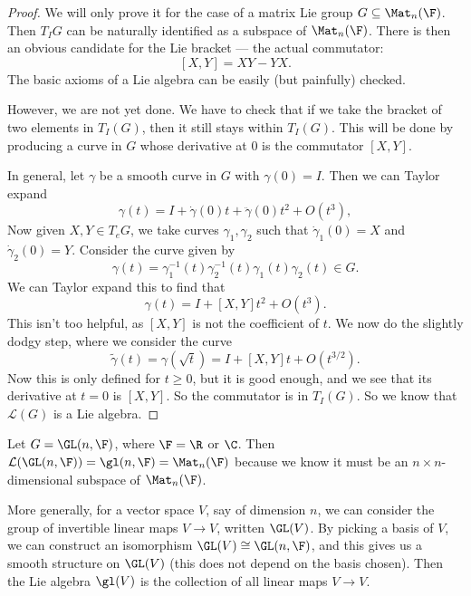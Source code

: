 \documentclass[a4paper]{article}
\begin{document}
\begin{proof}
  We will only prove it for the case of a matrix Lie group $G \subseteq \Mat_n(\F)$. Then $T_I G$ can be naturally identified as a subspace of $\Mat_n(\F)$. There is then an obvious candidate for the Lie bracket --- the actual commutator:
  \[
    [X, Y] = XY - YX.
  \]
  The basic axioms of a Lie algebra can be easily (but painfully) checked.

  However, we are not yet done. We have to check that if we take the bracket of two elements in $T_I(G)$, then it still stays within $T_I(G)$. This will be done by producing a curve in $G$ whose derivative at $0$ is the commutator $[X, Y]$.

  In general, let $\gamma$ be a smooth curve in $G$ with $\gamma(0) = I$. Then we can Taylor expand
  \[
    \gamma(t) = I + \dot{\gamma}(0) t + \ddot{\gamma}(0) t^2 + O(t^3),
  \]
  Now given $X, Y \in T_e G$, we take curves $\gamma_1, \gamma_2$ such that $\dot{\gamma}_1(0) = X$ and $\dot{\gamma}_2(0) = Y$. Consider the curve given by
  \[
    \gamma(t) = \gamma_1^{-1}(t) \gamma_2^{-1}(t) \gamma_1(t)\gamma_2(t) \in G.
  \]
  We can Taylor expand this to find that
  \[
    \gamma(t) = I + [X, Y] t^2 + O(t^3).
  \]
  This isn't too helpful, as $[X, Y]$ is not the coefficient of $t$. We now do the slightly dodgy step, where we consider the curve
  \[
    \tilde{\gamma}(t) = \gamma(\sqrt{t}) = I + [X, Y] t + O(t^{3/2}).
  \]
  Now this is only defined for $t \geq 0$, but it is good enough, and we see that its derivative at $t = 0$ is $[X, Y]$. So the commutator is in $T_I(G)$. So we know that $\mathcal{L}(G)$ is a Lie algebra.
\end{proof}

\begin{eg}
  Let $G = \GL(n, \F)$, where $\F = \R$ or $\C$. Then $\mathcal{L}(\GL(n, \F)) = \gl(n, \F) = \Mat_n(\F)$ because we know it must be an $n \times n$-dimensional subspace of $\Mat_n(\F)$.

  More generally, for a vector space $V$, say of dimension $n$, we can consider the group of invertible linear maps $V \to V$, written $\GL(V)$. By picking a basis of $V$, we can construct an isomorphism $\GL(V) \cong \GL(n, \F)$, and this gives us a smooth structure on $\GL(V)$ (this does not depend on the basis chosen). Then the Lie algebra $\gl(V)$ is the collection of all linear maps $V \to V$.
\end{eg}
\end{document}
